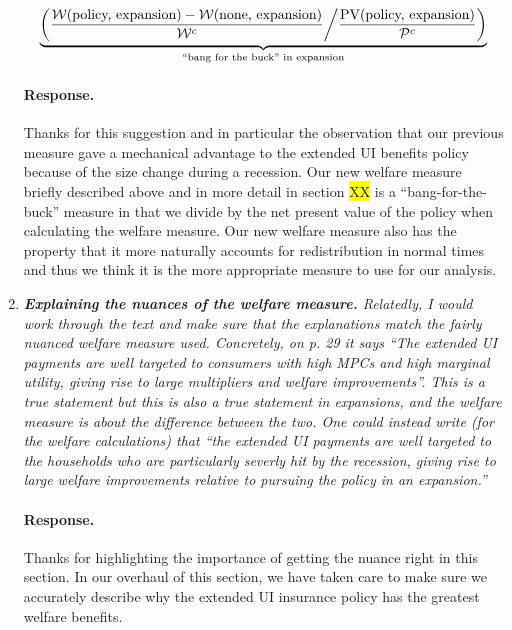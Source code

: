 \documentclass[12pt,letterpaper,english]{article}
\begin{document}
\begin{enumerate}
	\[ \underbrace{\left( \frac{\mathcal{W}(\text{policy, expansion}) - \mathcal{W}(\text{none, expansion})}{\mathcal{W}^c} \middle/ \frac{\text{PV}(\text{policy, expansion})}{\mathcal{P}^c} \right)}_{\text{``bang for the buck'' in expansion}} \]

	\paragraph{Response.} Thanks for this suggestion and in particular the observation that our previous measure gave a mechanical advantage to the extended UI benefits policy because of the size change during a recession. Our new welfare measure briefly described above and in more detail in section \colorbox{yellow}{XX} is a ``bang-for-the-buck'' measure in that we divide by the net present value of the policy when calculating the welfare measure. Our new welfare measure also has the property that it more naturally accounts for redistribution in normal times and thus we think it is the more appropriate measure to use for our analysis.

	\item \textit{\textbf{Explaining the nuances of the welfare measure.} Relatedly, I would work through the text and make sure that the explanations	match the fairly nuanced welfare measure used. Concretely, on p. 29 it says ``The extended UI payments are well targeted to consumers with high MPCs and high marginal utility, giving rise to large multipliers and welfare improvements''. This is a true statement but this is also a true statement in expansions, and the welfare measure is about the difference between the two. One could instead write (for the welfare calculations) that ``the extended UI payments are well targeted to the households who are particularly severly hit by the recession, giving rise to large welfare improvements relative to pursuing the policy in an expansion.''} 
	
	\paragraph{Response.} Thanks for highlighting the importance of getting the nuance right in this section. In our overhaul of this section, we have taken care to make sure we accurately describe why the extended UI insurance policy has the greatest welfare benefits.


\end{enumerate}
\end{document}
